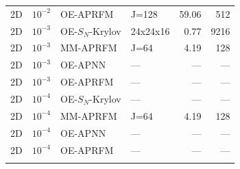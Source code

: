 \begin{table}[t]
\begin{tabular}{lcllrr}
2D & $10^{-2}$ & OE-APRFM & J=128 & 59.06 & 512\\
\addlinespace
2D & $10^{-3}$ & OE-$S_N$-Krylov & 24x24x16 & 0.77 & 9216\\
2D & $10^{-3}$ & MM-APRFM & J=64 & 4.19 & 128\\
2D & $10^{-3}$ & OE-APNN & --- & --- & ---\\
2D & $10^{-3}$ & OE-APRFM & --- & --- & ---\\
\addlinespace
2D & $10^{-4}$ & OE-$S_N$-Krylov & --- & --- & ---\\
2D & $10^{-4}$ & MM-APRFM & J=64 & 4.19 & 128\\
2D & $10^{-4}$ & OE-APNN & --- & --- & ---\\
2D & $10^{-4}$ & OE-APRFM & --- & --- & ---\\
\addlinespace
\bottomrule
\end{tabular}
\end{table}
